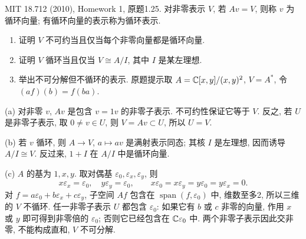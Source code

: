 \begin{exercise}\label{hw:1.25}
MIT 18.712 (2010), Homework 1, 原题1.25. 对非零表示 $V$, 若 $Av=V$, 则称 $v$ 为循环向量; 有循环向量的表示称为循环表示.
\begin{enumerate}[label=(\alph*)]
\item 证明 $V$ 不可约当且仅当每个非零向量都是循环向量.
\item 证明 $V$ 循环当且仅当 $V\cong A/I$, 其中 $I$ 是某左理想.
\item 举出不可分解但不循环的表示. 原题提示取 $A=\mathbb C[x,y]/(x,y)^2$, $V=A^*$, 令 $(af)(b)=f(ba)$.
\end{enumerate}
\end{exercise}
\begin{solution}
(a) 对非零 $v$, $Av$ 是包含 $v=1v$ 的非零子表示. 不可约性保证它等于 $V$. 反之, 若 $U$ 是非零子表示, 取 $0\ne v\in U$, 则 $V=Av\subset U$, 所以 $U=V$.

(b) 若 $v$ 循环, 则 $A\to V$, $a\mapsto av$ 是满射表示同态; 其核 $I$ 是左理想, 因而诱导 $A/I\cong V$. 反过来, $1+I$ 在 $A/I$ 中是循环向量.

(c) $A$ 的基为 $1,x,y$. 取对偶基 $\varepsilon_0,\varepsilon_x,\varepsilon_y$, 则
\[
x\varepsilon_x=\varepsilon_0,\quad y\varepsilon_y=\varepsilon_0,
\qquad x\varepsilon_0=x\varepsilon_y=y\varepsilon_0=y\varepsilon_x=0.
\]
对 $f=a\varepsilon_0+b\varepsilon_x+c\varepsilon_y$, 子空间 $Af$ 包含在 $\operatorname{span}(f,\varepsilon_0)$ 中, 维数至多2, 所以三维的 $V$ 不循环. 任一非零子表示 $U$ 都包含 $\varepsilon_0$: 如果它有 $b$ 或 $c$ 非零的向量, 作用 $x$ 或 $y$ 即可得到非零倍的 $\varepsilon_0$; 否则它已经包含在 $\mathbb C\varepsilon_0$ 中. 两个非零子表示因此交非零, 不能构成直和, $V$ 不可分解.
\end{solution}


